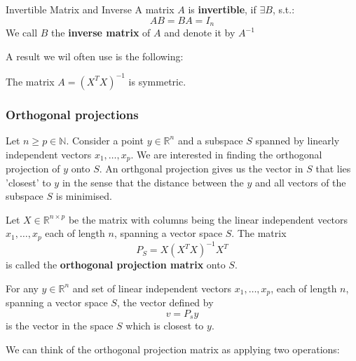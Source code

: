 \documentclass[11pt, %
	oneside, %
	english, %
	onehalfspacing, %
	]{article} %
\numberwithin{equation}{section}
\begin{document}
\begin{definition}{Invertible Matrix and Inverse}{}
    A matrix ${A}$ is \textbf{invertible}, if $\exists {B}$, s.t.:
    \begin{equation*}
    {A B}={B A}={I}_n
    \end{equation*}
    We call $B$ the  \textbf{inverse matrix} of $A$ and denote it by ${A}^{-1}$
\end{definition}

A result we wil often use is the following:

\begin{proposition}{}{}
    The matrix $A = (X^T X)^{-1}$ is symmetric.
\end{proposition}


\subsubsection{Orthogonal projections}

Let $n \geq p \in \mathbb{N}$. Consider a point $y \in \mathbb{R}^n$ and a subspace $S$ spanned by linearly independent vectors $x_1, \ldots, x_p$. We are interested in finding the orthogonal projection of $y$ onto $S$. An orthgonal projection gives us the vector in $S$ that lies 'closest' to $y$ in the sense that the distance between the $y$ and all vectors of the subspace $S$ is minimised.

\begin{definition}{}{}
    Let $X \in \mathbb{R}^{n \times p}$ be the matrix with columns being the linear independent vectors $x_1, \ldots, x_p$ each of length $n$, spanning a vector space $S$. The matrix
    \begin{equation}\label{eq:orth_proj_matrix}
        P_S=X\left(X^T X\right)^{-1} X^T
    \end{equation}
    is called the \textbf{orthogonal projection matrix} onto $S$.
\end{definition}{}{}

\begin{proposition}{}{}
    For any $y \in \mathbb{R}^n$ and set of  linear independent vectors $x_1, \ldots, x_p$, each of length $n$, spanning a vector space $S$, the vector defined by
    \begin{equation*}
        v = P_s y
    \end{equation*}
    is the vector in the space $S$ which is closest to $y$.
\end{proposition}

We can think of the orthogonal projection matrix as applying two operations:
\end{document}
